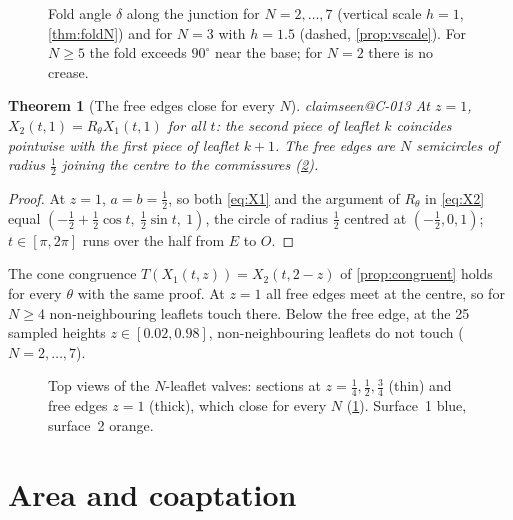 \documentclass[11pt,a4paper]{article}
\makeatletter
\theoremstyle{plain}
\newtheorem{theorem}{Theorem}[section]
\theoremstyle{remark}
\newcommand{\claim}[1]{\ifcsname claimseen@#1\endcsname\else\expandafter\gdef\csname claimseen@#1\endcsname{}\label{claim:#1}\fi}
\makeatother
\begin{document}
\begin{figure}[t]\centering

\caption{Fold angle $\delta$ along the junction for $N=2,\dots,7$ (vertical scale $h=1$, \cref{thm:foldN}) and for $N=3$
with $h=1.5$ (dashed, \cref{prop:vscale}). For $N\ge5$ the fold exceeds $90^\circ$ near the base; for $N=2$ there is no crease.}
\label{fig:fold}
\end{figure}

\begin{theorem}[The free edges close for every $N$]\label{thm:freeedge}\claim{C-013}
At $z=1$, $X_2(t,1)=R_\theta X_1(t,1)$ for all $t$: the second piece of leaflet $k$ coincides pointwise with the first piece
of leaflet $k+1$. The free edges are $N$ semicircles of radius $\frac12$ joining the centre to the commissures
(\cref{fig:top}).
\end{theorem}
\begin{proof}
At $z=1$, $a=b=\frac12$, so both \eqref{eq:X1} and the argument of $R_\theta$ in \eqref{eq:X2} equal
$(-\frac12+\frac12\cos t,\ \frac12\sin t,\ 1)$, the circle of radius $\frac12$ centred at $(-\frac12,0,1)$; $t\in[\pi,2\pi]$
runs over the half from $E$ to $O$.
\end{proof}

The cone congruence $T(X_1(t,z))=X_2(t,2-z)$ of \cref{prop:congruent} holds for every $\theta$ with the same proof. At $z=1$
all free edges meet at the centre, so for $N\ge4$ non-neighbouring leaflets touch there. Below the free edge, at the 25
sampled heights $z\in[0.02,0.98]$, non-neighbouring leaflets do not touch ($N=2,\dots,7$).

\begin{figure}[t]\centering

\caption{Top views of the $N$-leaflet valves: sections at $z=\frac14,\frac12,\frac34$ (thin) and free edges $z=1$ (thick),
which close for every $N$ (\cref{thm:freeedge}). Surface~1 blue, surface~2 orange.}
\label{fig:top}
\end{figure}

\section{Area and coaptation}\label{sec:area}
\end{document}

